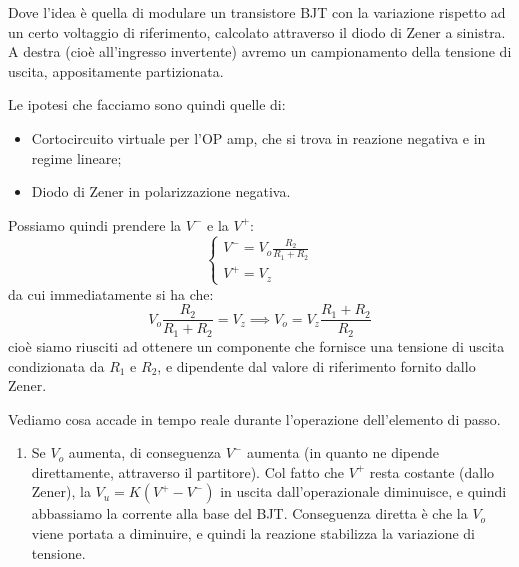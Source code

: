 \documentclass[a4paper,11pt]{article}
\begin{document}
Dove l'idea è quella di modulare un transistore BJT con la variazione rispetto ad un certo voltaggio di riferimento, calcolato attraverso il diodo di Zener a sinistra. A destra (cioè all'ingresso invertente) avremo un campionamento della tensione di uscita, appositamente partizionata.

Le ipotesi che facciamo sono quindi quelle di:
\begin{itemize}
	\item Cortocircuito virtuale per l'OP amp, che si trova in reazione negativa e in regime lineare;
	\item Diodo di Zener in polarizzazione negativa.
\end{itemize}

Possiamo quindi prendere la $V^-$ e la $V^+$:
$$
\begin{cases}
	V^- = V_o \frac{R_2}{R_1 + R_2} \\
	V^+ = V_z
\end{cases}
$$
da cui immediatamente si ha che:
$$
V_o \frac{R_2}{R_1 + R_2} = V_z \implies V_o = V_z \frac{R_1 + R_2}{R_2}
$$
cioè siamo riusciti ad ottenere un componente che fornisce una tensione di uscita condizionata da $R_1$ e $R_2$, e dipendente dal valore di riferimento fornito dallo Zener.

Vediamo cosa accade in tempo reale durante l'operazione dell'elemento di passo.
\begin{enumerate}
	\item Se $V_o$ aumenta, di conseguenza $V^-$ aumenta (in quanto ne dipende direttamente, attraverso il partitore). Col fatto che $V^+$ resta costante (dallo Zener), la $V_u = K(V^+ - V^-)$ in uscita dall'operazionale diminuisce, e quindi abbassiamo la corrente alla base del BJT. Conseguenza diretta è che la $V_o$ viene portata a diminuire, e quindi la reazione stabilizza la variazione di tensione.
\end{enumerate}
\end{document}
